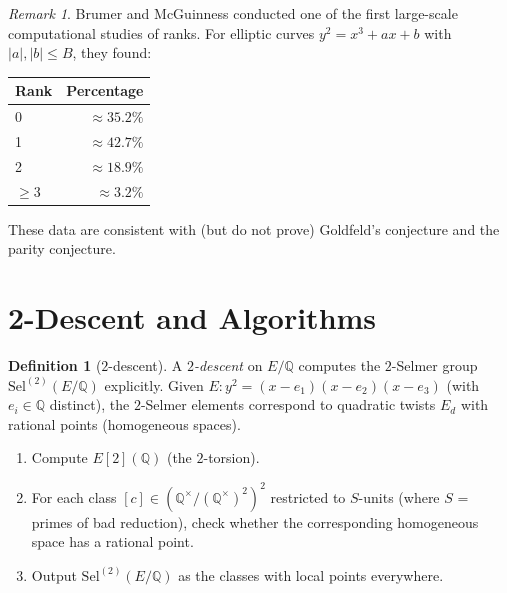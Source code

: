\documentclass[12pt,a4paper]{amsart}
\theoremstyle{definition}
\newtheorem{definition}[theorem]{Definition}
\theoremstyle{remark}
\newtheorem{remark}[theorem]{Remark}
\newcommand{\Q}{\mathbb{Q}}
\newcommand{\Sel}{\mathrm{Sel}}
\begin{document}
\begin{remark}
  Brumer and McGuinness \cite{BM1990} conducted one of the first large-scale
  computational studies of ranks. For elliptic curves $y^2 = x^3 + ax + b$ with
  $|a|, |b| \leq B$, they found:
  \begin{center}
    \begin{tabular}{lr}
      \toprule
      Rank & Percentage \\
      \midrule
      0 & $\approx 35.2\%$ \\
      1 & $\approx 42.7\%$ \\
      2 & $\approx 18.9\%$ \\
      $\geq 3$ & $\approx 3.2\%$ \\
      \bottomrule
    \end{tabular}
  \end{center}
  These data are consistent with (but do not prove) Goldfeld's conjecture and the
  parity conjecture.
\end{remark}

\section{2-Descent and Algorithms}\label{sec:descent}

\begin{definition}[$2$-descent]
  A \emph{$2$-descent} on $E/\Q$ computes the $2$-Selmer group
  $\Sel^{(2)}(E/\Q)$ explicitly. Given $E\colon y^2 = (x-e_1)(x-e_2)(x-e_3)$
  (with $e_i \in \Q$ distinct), the $2$-Selmer elements correspond to
  quadratic twists $E_d$ with rational points (homogeneous spaces).
\end{definition}

\begin{algorithm}
  \begin{enumerate}[label=(\arabic*)]
    \item Compute $E[2](\Q)$ (the $2$-torsion).
    \item For each class $[c] \in (\Q^\times / (\Q^\times)^2)^2$ restricted to
      $S$-units (where $S$ = primes of bad reduction), check whether the corresponding
      homogeneous space has a rational point.
    \item Output $\Sel^{(2)}(E/\Q)$ as the classes with local points everywhere.
  \end{enumerate}
\end{algorithm}
\end{document}
